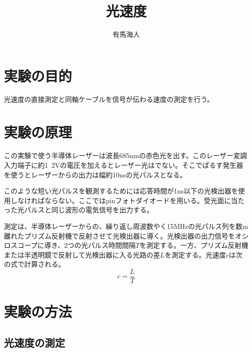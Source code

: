 \documentclass{jsarticle}
\begin{document}
\title{光速度}
\author{有馬海人}
\maketitle

\section{実験の目的}

光速度の直接測定と同軸ケーブルを信号が伝わる速度の測定を行う。

\section{実験の原理}

    この実験で使う半導体レーザーは波長685nmの赤色光を出す。このレーザー変調入力端子に約1~2Vの電圧を加えるとレーザー光はでない。そこでぱるす発生器を使うとレーザーからの出力は幅約10nsの光パルスとなる。\\
    \par このような短い光パルスを観測するためには応答時間が1ns以下の光検出器を使用しなければならない。ここではpinフォトダイオードを用いる。受光面に当たった光パルスと同じ波形の電気信号を出力する。\\
    \par 測定は、半導体レーザーからの、繰り返し周波数やく15MHzの光パルス列を数m離れたプリズム反射機で反射させて光検出器に導く。光検出器の出力信号をオシロスコープに導き、2つの光パルス時間間隔$T$を測定する。一方、プリズム反射機または半透明鏡で反射して光検出器に入る光路の差$L$を測定する。光速度$c$は次の式で計算される。
\begin{equation}
\label{lighrningspeed}
    c = \frac{L}{T}
\end{equation}

\section{実験の方法}

\subsection{光速度の測定}
\end{document}
